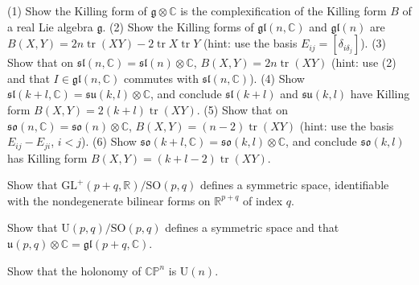 \begin{remark}
  \label{rem:pet-ch10-exercise-killing-form-classical}
  (1) Show the Killing form of $\mathfrak g\otimes\mathbb C$ is the
  complexification of the Killing form $B$ of a real Lie algebra $\mathfrak g$.
  (2) Show the Killing forms of $\mathfrak{gl}(n,\mathbb C)$ and $\mathfrak{gl}(n)$
  are $B(X,Y)=2n\operatorname{tr}(XY)-2\operatorname{tr}X\operatorname{tr}Y$ (hint: use the basis
  $E_{ij}=[\delta_{i\delta_j}]$). (3) Show that on
  $\mathfrak{sl}(n,\mathbb C)=\mathfrak{sl}(n)\otimes\mathbb C$, $B(X,Y)=2n\operatorname{tr}(XY)$
  (hint: use (2) and that $I\in\mathfrak{gl}(n,\mathbb C)$ commutes with
  $\mathfrak{sl}(n,\mathbb C)$). (4) Show $\mathfrak{sl}(k+l,\mathbb C)=\mathfrak{su}(k,l)\otimes\mathbb C$,
  and conclude $\mathfrak{sl}(k+l)$ and $\mathfrak{su}(k,l)$ have Killing form
  $B(X,Y)=2(k+l)\operatorname{tr}(XY)$. (5) Show that on
  $\mathfrak{so}(n,\mathbb C)=\mathfrak{so}(n)\otimes\mathbb C$, $B(X,Y)=(n-2)\operatorname{tr}(XY)$
  (hint: use the basis $E_{ij}-E_{ji}$, $i<j$). (6) Show
  $\mathfrak{so}(k+l,\mathbb C)=\mathfrak{so}(k,l)\otimes\mathbb C$, and conclude
  $\mathfrak{so}(k,l)$ has Killing form $B(X,Y)=(k+l-2)\operatorname{tr}(XY)$.
\end{remark}

\begin{remark}
  \label{rem:pet-ch10-exercise-gl-so-symmetric}
  Show that $\mathrm{GL}^+(p+q,\mathbb R)/\mathrm{SO}(p,q)$ defines a symmetric space,
  identifiable with the nondegenerate bilinear forms on $\mathbb R^{p+q}$ of index
  $q$.
\end{remark}

\begin{remark}
  \label{rem:pet-ch10-exercise-u-pq-so-pq-symmetric}
  Show that $\mathrm U(p,q)/\mathrm{SO}(p,q)$ defines a symmetric space and that
  $\mathfrak u(p,q)\otimes\mathbb C=\mathfrak{gl}(p+q,\mathbb C)$.
\end{remark}

\begin{remark}
  \label{rem:pet-ch10-exercise-cpn-holonomy}
  Show that the holonomy of $\mathbb{CP}^n$ is $\mathrm U(n)$.
\end{remark}

